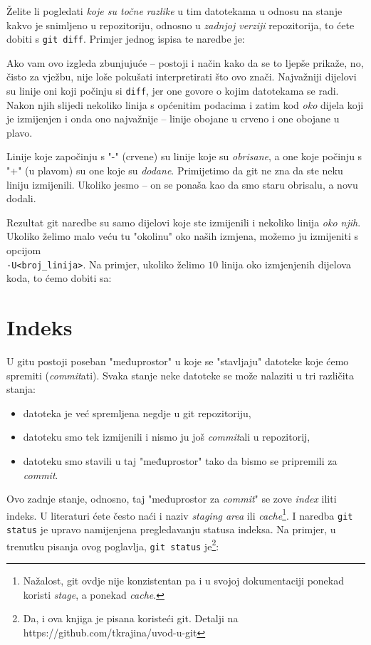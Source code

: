 Želite li pogledati \emph{koje su točne razlike} u tim datotekama u odnosu na stanje kakvo je snimljeno u repozitoriju, odnosno u \emph{zadnjoj verziji} repozitorija, to ćete dobiti s \verb+git diff+. 
Primjer jednog ispisa te naredbe je:



Ako vam ovo izgleda zbunjujuće -- postoji i način kako da se to ljepše prikaže, no, čisto za vježbu, nije loše pokušati interpretirati što ovo znači.
Najvažniji dijelovi su linije oni koji počinju si \verb+diff+, jer one govore o kojim datotekama se radi.
Nakon njih slijedi nekoliko linija s općenitim podacima i zatim kod \emph{oko} dijela koji je izmijenjen i onda ono najvažnije -- linije obojane u crveno i one obojane u plavo.

Linije koje započinju s "-" (crvene) su linije koje su \emph{obrisane}, a one koje počinju s "+" (u plavom) su one koje su \emph{dodane}. 
Primijetimo da git ne zna da ste neku liniju izmijenili. 
Ukoliko jesmo -- on se ponaša kao da smo staru obrisalu, a novu dodali.

Rezultat git naredbe su samo dijelovi koje ste izmijenili i nekoliko linija \emph{oko njih}.
Ukoliko želimo malo veću tu "okolinu" oko naših izmjena, možemo ju izmijeniti s opcijom \\ \verb+-U<broj_linija>+.
Na primjer, ukoliko želimo $10$ linija oko izmjenjenih dijelova koda, to ćemo dobiti sa:


\section*{Indeks}

U gitu postoji poseban "međuprostor" u koje se "stavljaju" datoteke koje ćemo spremiti (\emph{commit}ati).
Svaka stanje neke datoteke se može nalaziti u tri različita stanja:

\begin{itemize}
	\item datoteka je već spremljena negdje u git repozitoriju,
	\item datoteku smo tek izmijenili i nismo ju još \emph{commit}ali u repozitorij,
	\item datoteku smo stavili u taj "međuprostor" tako da bismo se pripremili za \emph{commit}.
\end{itemize}

Ovo zadnje stanje, odnosno, taj "međuprostor za \emph{commit}" se zove \emph{index} iliti indeks.
U literaturi ćete često naći i naziv \emph{staging area} ili \emph{cache}\footnote{Nažalost, git ovdje nije konzistentan pa i u svojoj dokumentaciji ponekad koristi \emph{stage}, a ponekad \emph{cache}.}.
I naredba \verb+git status+ je upravo namijenjena pregledavanju statusa indeksa.
Na primjer, u trenutku pisanja ovog poglavlja, \verb+git status+ je\footnote{Da, i ova knjiga je pisana koristeći git. Detalji na https://github.com/tkrajina/uvod-u-git}:

